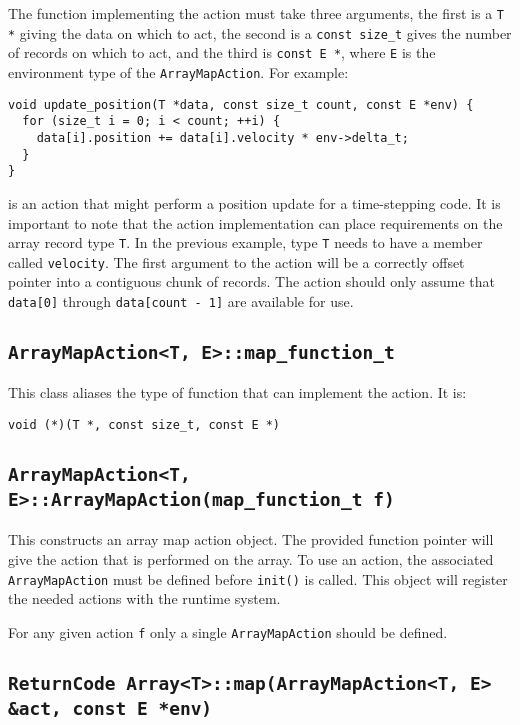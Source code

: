 The function implementing the action must take three arguments, the first is
a {\tt T *} giving the data on which to act, the second is a {\tt const size\_t}
gives the number of records on which to act, and the third is {\tt const E *},
where {\tt E} is the environment type of the {\tt ArrayMapAction}. For example:

\begin{verbatim}
void update_position(T *data, const size_t count, const E *env) {
  for (size_t i = 0; i < count; ++i) {
    data[i].position += data[i].velocity * env->delta_t;
  }
}
\end{verbatim}

\noindent is an action that might perform a position update for a
time-stepping code.
It is important to note that the action implementation can place requirements
on the array record type {\tt T}. In the previous example, type {\tt T} needs to
have a member called {\tt velocity}. The first argument to the action will be a
correctly offset pointer into a contiguous chunk of records. The action should
only assume that {\tt data[0]} through {\tt data[count - 1]} are available for
use.

\subsection{{\tt ArrayMapAction<T, E>::map\_function\_t}}

This class aliases the type of function that can implement the action. It is:

\begin{verbatim}
void (*)(T *, const size_t, const E *)
\end{verbatim}

\subsection{{\tt ArrayMapAction<T, E>::ArrayMapAction(map\_function\_t f)}}

This constructs an array map action object. The provided function pointer
will give the action that is performed on the array. To use an action,
the associated {\tt ArrayMapAction} must be defined before {\tt init()} is
called. This object will register the needed actions with the runtime system.

For any given action {\tt f} only a single {\tt ArrayMapAction}
should be defined.

\subsection{{\tt ReturnCode Array<T>::map(ArrayMapAction<T, E> \&act, const E
    *env)}}

